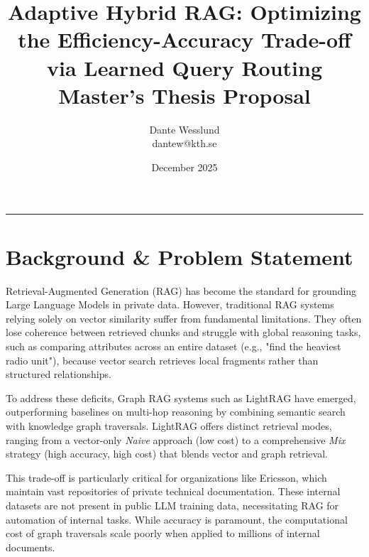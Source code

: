 \documentclass[11pt, a4paper]{article}
\begin{document}
\title{
    \textbf{Adaptive Hybrid RAG: Optimizing the Efficiency-Accuracy Trade-off via Learned Query Routing} \\
    \vspace{0.5em}
    \large Master's Thesis Proposal
}

\author{
    Dante Wesslund \\
    dantew@kth.se}


\date{December 2025}

\maketitle

\hrule
\vspace{1cm}


\section{Background \& Problem Statement}

Retrieval-Augmented Generation (RAG) has become the standard for grounding Large Language Models in private data. However, traditional RAG systems relying solely on vector similarity suffer from fundamental limitations. They often lose coherence between retrieved chunks and struggle with global reasoning tasks, such as comparing attributes across an entire dataset (e.g., "find the heaviest radio unit"), because vector search retrieves local fragments rather than structured relationships. 

To address these deficits, Graph RAG systems such as LightRAG have emerged, outperforming baselines on multi-hop reasoning by combining semantic search with knowledge graph traversals. LightRAG offers distinct retrieval modes, ranging from a vector-only \emph{Naive} approach (low cost) to a comprehensive \emph{Mix} strategy (high accuracy, high cost) that blends vector and graph retrieval.

This trade-off is particularly critical for organizations like Ericsson, which maintain vast repositories of private technical documentation. These internal datasets are not present in public LLM training data, necessitating RAG for automation of internal tasks. While accuracy is paramount, the computational cost of graph traversals scale poorly when applied to millions of internal documents.
\end{document}
